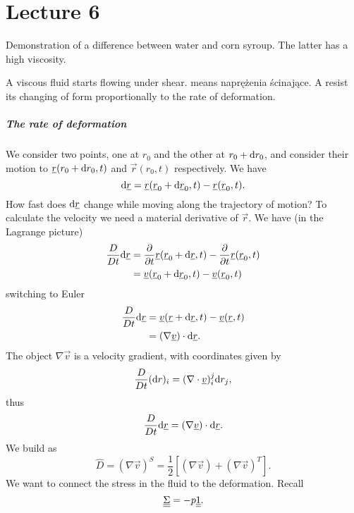 \documentclass[../main.tex]{subfiles}
\begin{document}
  \chapter{Lecture 6}

  Demonstration of a difference between water and corn syroup.
  The latter has a high viscosity.

  A viscous fluid starts flowing under shear. %
   means naprężenia ścinające.
  A  resist its changing of form proportionally to the rate of deformation.

  \paragraph{The rate of deformation}
  We consider two points, one at $r_0$ and the other at $r_0 + \mathrm{d} r_0$, and consider their motion to 
  $\underline{r}(r_0 + \mathrm{d} r_0, t)$ and $\vec r(r_0, t)$ respectively.
  We have
  \begin{displaymath}
    \mathrm{d} \underline{r}= \underline{r}(\underline{r}_0 + \mathrm{d} \underline{r}_0, t) - \underline{r} ( \underline{r}_0, t).
  \end{displaymath}
  How fast does $\mathrm{d} \underline{r}$ change while moving along the trajectory of motion?
  To calculate the velocity we need a material derivative of $\vec r$.
  We have (in the Lagrange picture)
  \begin{align*}
    \frac{D}{Dt} \mathrm{d} \underline{r} &= \frac{\partial }{\partial t} \underline{r} (\underline{r}_0 + \mathrm{d} \underline{r}, t) - \frac{\partial }{\partial t}\underline{r}(\underline{r}_0, t)\\
    &= \underline{v}(\underline{r}_0 + \mathrm{d} \underline{r}_0, t) - \underline{v}(\underline{r}_0, t)
  \end{align*}
  switching to Euler
  \begin{align*}
    \frac{D}{Dt} \mathrm{d} \underline{r} &= \underline{v}(\underline{r} + \mathrm{d} \underline{r}, t) - \underline{v}(\underline{r}, t)\\
    &= (\nabla \underline{v}) \cdot \mathrm{d} \underline{r}.
  \end{align*}
  The object $\nabla \vec v$ is a velocity gradient, with coordinates given by
  \begin{displaymath}
    \frac{D}{Dt} (\mathrm{d} r)_i = (\nabla \cdot \underline{v})_i^j \mathrm{d} r_j, 
  \end{displaymath}
  thus
  \begin{displaymath}
    \frac{D}{Dt} \mathrm{d} \underline{r} = (\nabla \underline{v}) \cdot \mathrm{d} \underline{r}.
  \end{displaymath}
  We build  as
  \begin{displaymath}
    \hat D = (\nabla \vec v)^S = \frac{1}{2} \left[ (\nabla \vec v) + (\nabla \vec v)^T \right].
  \end{displaymath}
  We want to connect the stress in the fluid to the deformation.
  Recall
  \begin{displaymath}
    \underline{\underline{{\Sigma}}}  = - p \underline{\underline{{1}}}.
  \end{displaymath}
\end{document}
